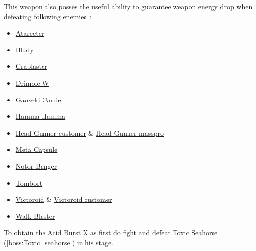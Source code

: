 This weapon also posses the useful ability to guarantee weapon energy drop when defeating following enemies~\cite{X3:enem_drop_gfaqs}:
\begin{itemize}
	\item \hyperlink{enem:Atareeter}{Atareeter}
	\item \hyperlink{enem:Blady}{Blady}
	\item \hyperlink{enem:Crablaster}{Crablaster}
	\item \hyperlink{enem:Drimole-W }{Drimole-W }
	\item \hyperlink{enem:Ganseki_Carrier}{Ganseki Carrier}
	\item \hyperlink{enem:Hamma_Hamma}{Hamma Hamma}
	\item \hyperlink{enem:Head_Gunner_customer}{Head Gunner customer} \& \hyperlink{enem:Head_Gunner_masspro}{Head Gunner masspro}
	\item \hyperlink{enem:Meta_Capsule}{Meta Capsule}
	\item \hyperlink{enem:Notor_Banger}{Notor Banger}
	\item \hyperlink{enem:Tombort}{Tombort}
	\item \hyperlink{enem:Victoroid}{Victoroid} \& \hyperlink{enem:Victoroid_customer}{Victoroid customer}
	\item \hyperlink{enem:Walk Blaster}{Walk Blaster}
\end{itemize}

To obtain the Acid Burst X as first do fight and defeat Toxic Seahorse (\ref{boss:Toxic_seahorse}) in his stage.

